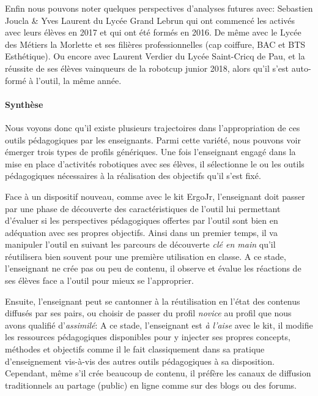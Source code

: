             Enfin nous pouvons noter quelques perspectives d'analyses futures avec:
            Sebastien Joucla \& Yves Laurent du Lycée Grand Lebrun qui ont commencé les activés avec leurs élèves en 2017 et qui ont été formés en 2016. De même avec le Lycée des Métiers la Morlette et ses filières professionnelles (\eg cap coiffure, BAC et BTS Esthétique). Ou encore avec 
            Laurent Verdier du Lycée Saint-Cricq de Pau, et la réussite de ses élèves vainqueurs de la robotcup junior 2018, alors qu'il s'est auto-formé à l'outil, la même année.
    \paragraph{Synthèse}
        Nous voyons donc qu'il existe plusieurs trajectoires dans l'appropriation de ces outils pédagogiques par les enseignants. Parmi cette variété, nous pouvons voir émerger trois types de profils génériques.
        Une fois l'enseignant engagé dans la mise en place d'activités robotiques avec ses élèves, il sélectionne le ou les outils pédagogiques nécessaires à la réalisation des objectifs qu'il s'est fixé.\par%
        Face à un dispositif nouveau, comme avec le kit ErgoJr, l'enseignant doit passer par une phase de découverte des caractéristiques de l'outil lui permettant d'évaluer si les perspectives pédagogiques offertes par l'outil sont bien en adéquation avec ses propres objectifs. Ainsi dans un premier temps, il va manipuler l'outil en suivant les parcours de découverte \textit{clé en main} qu'il réutilisera bien souvent pour une première utilisation en classe. A ce stade, l'enseignant ne crée pas ou peu de contenu, il observe et évalue les réactions de ses élèves face a l'outil pour mieux se l'approprier.\par%
        Ensuite, l'enseignant peut se cantonner à la réutilisation en l'état des contenus diffusés par ses pairs, ou choisir de passer du profil \textit{novice} au profil que nous avons qualifié d'\textit{assimilé}:
        A ce stade, l'enseignant est \textit{à l'aise} avec le kit, il modifie les ressources pédagogiques disponibles pour y injecter ses propres concepts, méthodes et objectifs comme il le fait classiquement dans sa pratique d'enseignement vis-à-vis des autres outils pédagogiques à sa disposition. Cependant, même s'il crée beaucoup de contenu, il préfère les canaux de diffusion traditionnels au partage (public) en ligne comme sur des blogs ou des forums.\par%
